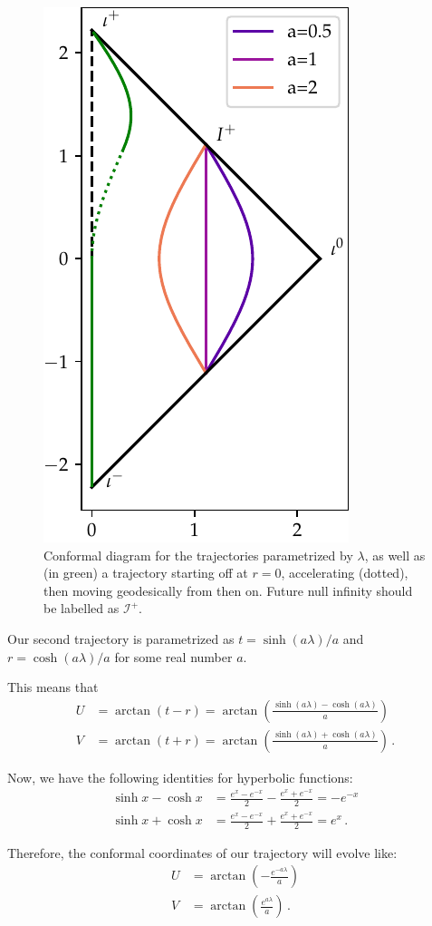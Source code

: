 \documentclass[main.tex]{subfiles}
\begin{document}
\begin{figure}[ht]
\centering
\includegraphics[width=.4\textwidth]{figures/conformal_trajectory}
\caption{Conformal diagram for the trajectories parametrized by \(\lambda \), as well as (in green) a trajectory starting off at \(r = 0\), accelerating (dotted), then moving geodesically from then on.
Future null infinity should be labelled as \(\mathscr{I}^+\). 
}
\label{fig:conformal_trajectory}
\end{figure}

Our second trajectory is parametrized as \(t = \sinh(a \lambda ) / a\) and \(r = \cosh(a \lambda ) / a\) 
for some real number \(a\).

This means that %
\begin{align}
U &= \arctan(t-r) = \arctan(\frac{\sinh(a \lambda ) - \cosh(a \lambda )}{a})  \\
V &= \arctan(t+r) = \arctan(\frac{\sinh(a \lambda ) + \cosh(a \lambda )}{a})
\,.
\end{align}

Now, we have the following identities for hyperbolic functions: 
%
\begin{align}
\sinh x - \cosh x &= \frac{e^x - e^{-x}}{2} - \frac{e^x + e^{-x}}{2} = - e^{-x}  \\
\sinh x + \cosh x &= \frac{e^x - e^{-x}}{2} + \frac{e^x + e^{-x}}{2} = e^{x}  
\,.
\end{align}

Therefore, the conformal coordinates of our trajectory will evolve like: 
%
\begin{align}
U &= \arctan(- \frac{e^{-a \lambda }}{a}) \\
V &= \arctan(\frac{e^{a \lambda }}{a})
\,.
\end{align}
\end{document}
